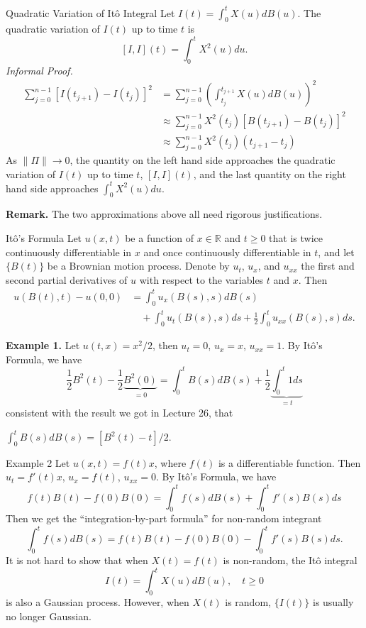 \documentclass[letterpaper,handout]{beamer}
\def\Sum{\sum\nolimits}
\begin{document}
\begin{frame}{Quadratic Variation of It\^{o} Integral}
Let $I(t)=\int_0^t X(u)d B(u)$. The quadratic variation of $I(t)$ up to time $t$ is $$[I,I](t)=\int_0^t X^2(u)du.$$
{\em Informal Proof.}
\begin{align*}
\Sum_{j=0}^{n-1}[I(t_{j+1})-I(t_j)]^2
&=\Sum_{j=0}^{n-1}\left(\int_{t_j}^{t_{j+1}} X(u)d B(u)\right)^2\\
&\approx\Sum_{j=0}^{n-1} X^2(t_j)[B(t_{j+1})-B(t_j)]^2\\
&\approx\Sum_{j=0}^{n-1} X^2(t_j)(t_{j+1}-t_j)
\end{align*}
As $\|\Pi\|\to 0$, the quantity on the left hand side approaches the quadratic variation of $I(t)$ up to time $t$, $[I,I](t)$, and the last quantity on the right hand side approaches $\int_0^t X^2(u)du.$\bigskip

{\bf Remark. } The two approximations above all need rigorous justifications.
\end{frame}
\begin{frame}{It\^{o}'s Formula}
Let $u(x,t)$ be a function of $x\in \mathbb{R}$ and $t \ge 0$ that is twice continuously differentiable
in $x$ and once continuously differentiable in $t$, and let $\{B(t)\}$ be a Brownian motion process.
Denote by $u_t$, $u_x$, and $u_{xx}$ the first and second partial derivatives of $u$ with respect to the variables
$t$ and $x$. Then
\begin{align*}
u(B(t),t) - u(0,0)
&=\int_0^t u_x(B(s),s)d B(s)\\[-3pt]
&\quad+
\int_0^t u_t(B(s),s)d s +\frac{1}{2}\int_0^tu_{xx}(B(s),s)d s.
\end{align*}

{\bf Example 1.}
Let $u(t,x)=x^2/2$, then $u_t=0$, $u_x=x$, $u_{xx}=1$. By It\^{o}'s Formula, we have
$$
\frac{1}{2}B^2(t)-\frac{1}{2}\underbrace{B^2(0)}_{=0}
=\int_0^t B(s)d B(s) + \frac{1}{2}\underbrace{\int_0^t1d s}_{=t}
$$
consistent with the result we got in Lecture 26, that
\centerline{$\int_0^t B(s)d B(s)=[B^2(t)-t]/2.$}
\end{frame}
\begin{frame}{Example 2}
Let $u(x,t)=f(t)x$, where $f(t)$ is a differentiable function.
Then $u_t=f'(t)x$, $u_x=f(t)$, $u_{xx}=0.$ By It\^{o}'s Formula, we have
$$f(t)B(t) - f(0)B(0)=\int_0^t f(s)d B(s)+\int_0^t f'(s)B(s)d s$$
Then we get the ``integration-by-part formula'' for non-random integrant
$$\int_0^t f(s)d B(s) = f(t)B(t) - f(0)B(0)-\int_0^t f'(s)B(s)d s.$$
It is not hard to show that when $X(t)=f(t)$ is non-random, the It\^{o} integral
$$I(t)=\int_0^t X(u)d B(u), \quad t\ge 0$$
is also a Gaussian process. However, when $X(t)$ is random, $\{I(t)\}$ is usually no longer Gaussian.
\end{frame}
\end{document}
